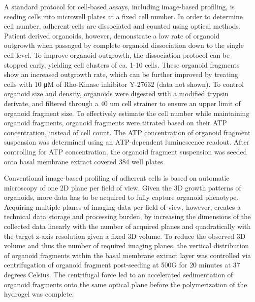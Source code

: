 \begin{flushleft}
\bigbreak

A standard protocol for cell-based assays, including image-based profiling, is seeding cells into microwell plates at a fixed cell number. In order to determine cell number, adherent cells are dissociated and counted using optical methods. Patient derived organoids, however, demonstrate a low rate of organoid outgrowth when passaged by complete organoid dissociation down to the single cell level. To improve organoid outgrowth, the dissociation protocol can be stopped early, yielding cell clusters of ca. 1-10 cells. These organoid fragments show an increased outgrowth rate, which can be further improved by treating cells with 10 μM of Rho-Kinase inhibitor Y-27632 (data not shown). To control organoid size and density, organoids were digested with a modified trypsin derivate, and filtered through a 40 um cell strainer to ensure an upper limit of organoid fragment size. To effectively estimate the cell number while maintaining organoid fragments, organoid fragments were titrated based on their ATP concentration, instead of cell count. The ATP concentration of organoid fragment suspension was determined using an ATP-dependent luminescence readout. After controlling for ATP concentration, the organoid fragment suspension was seeded onto basal membrane extract covered 384 well plates.

\bigbreak

Conventional image-based profiling of adherent cells is based on automatic microscopy of one 2D plane per field of view. Given the 3D growth patterns of organoids, more data has to be acquired to fully capture organoid phenotype. Acquiring multiple planes of imaging data per field of view, however, creates a technical data storage and processing burden, by increasing the dimensions of the collected data linearly with the number of acquired planes and quadratically with the target z-axis resolution given a fixed 3D volume. To reduce the observed 3D volume and thus the number of required imaging planes, the vertical distribution of organoid fragments within the basal membrane extract layer was controlled via centrifugation of organoid fragment post-seeding at 500G for 20 minutes at 37 degrees Celsius. The centrifugal force led to an accelerated sedimentation of organoid fragments onto the same optical plane before the polymerization of the hydrogel was complete.

\bigbreak


\end{flushleft}
